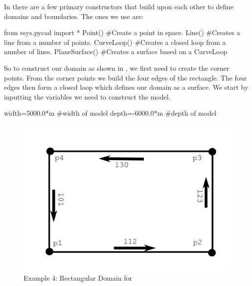 In \pycad there are a few primary constructors that build upon each other to
define domains and boundaries. The ones we use are:
\begin{python}
from esys.pycad import *
Point() #Create a point in space.
Line() #Creates a line from a number of points.
CurveLoop() #Creates a closed loop from a number of lines.
PlaneSurface() #Creates a surface based on a CurveLoop
\end{python}
So to construct our domain as shown in , we first need to
create the corner points. From the corner points we build the four edges of the
rectangle. The four edges then form a closed loop which defines our domain as a
surface. We start by inputting the variables we need to construct the model.
\begin{python}
width=5000.0*m   #width of model
depth=-6000.0*m  #depth of model
\end{python} 

\begin{figure}[ht]
\centerline{\includegraphics[width=4.in]{figures/pycadrec}}
\caption{Example 4: Rectangular Domain for \pycad}
\label{fig:pycad rec}
\end{figure}

